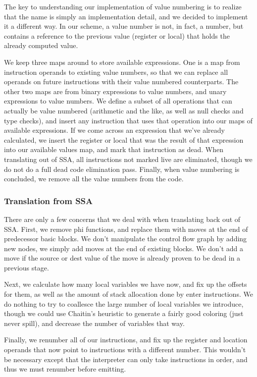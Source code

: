 \documentclass[12pt,letterpaper]{article}
\begin{document}
The key to understanding our implementation of value numbering is to
realize that the name is simply an implementation detail, and we
decided to implement it a different way. In our scheme, a value number
is not, in fact, a number, but contains a reference to the previous
value (register or local) that holds the already computed value.

We keep three maps around to store available expressions. One is a map
from instruction operands to existing value numbers, so that we can
replace all operands on future instructions with their value numbered
counterparts. The other two maps are from binary expressions to value
numbers, and unary expressions to value numbers. We define a subset of
all operations that can actually be value numbered (arithmetic and the
like, as well as null checks and type checks), and insert any
instruction that uses that operation into our maps of available
expressions. If we come across an expression that we've already
calculated, we insert the register or local that was the result of
that expression into our available values map, and mark that
instruction as dead. When translating out of SSA, all instructions not
marked live are eliminated, though we do not do a full dead code
elimination pass. Finally, when value numbering is concluded, we
remove all the value numbers from the code.

\subsubsection*{Translation from SSA}

There are only a few concerns that we deal with when translating back
out of SSA. First, we remove phi functions, and replace them with
moves at the end of predecessor basic blocks. We don't manipulate the
control flow graph by adding new nodes, we simply add moves at the end
of existing blocks. We don't add a move if the source or dest value of
the move is already proven to be dead in a previous stage.

Next, we calculate how many local variables we have now, and fix up
the offsets for them, as well as the amount of stack allocation done
by enter instructions. We do nothing to try to coallesce the large
number of local variables we introduce, though we could use Chaitin's
heuristic to generate a fairly good coloring (just never spill), and
decrease the number of variables that way.

Finally, we renumber all of our instructions, and fix up the register
and location operands that now point to instructions with a different
number. This wouldn't be necessary except that the interpreter can
only take instructions in order, and thus we must renumber before
emitting.
\end{document}
